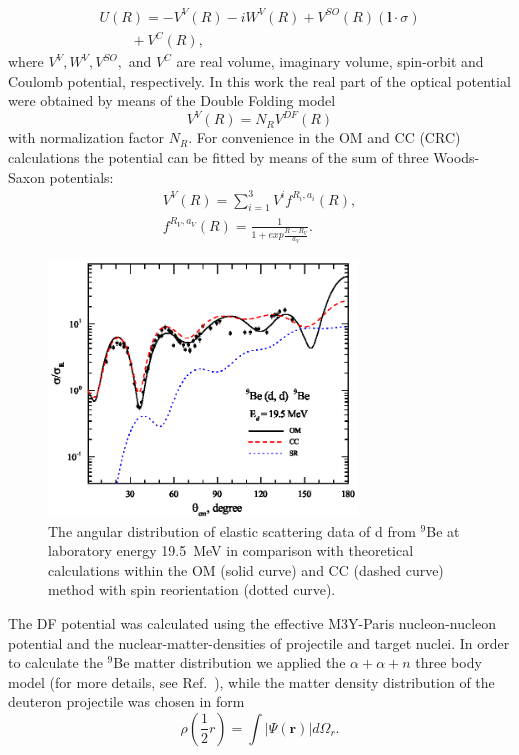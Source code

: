 \documentclass[10pt]{iopart}
\begin{document}
\begin{equation}\label{eqn:OP}
\begin{array}{l}
 U(R)=-V^{V}(R)-iW^{V}(R)+V^{SO}(R)( \mathbf{l} \cdot \sigma )\\
~~~ ~~~~~~~+V^C(R),
\end{array}
\end{equation}
where $V^{V}, W^{V}, V^{SO},$ and $V^C$ are real volume,  imaginary volume, spin-orbit and Coulomb potential, respectively. In this work the real part of the optical potential were obtained by means of the Double Folding model
\begin{equation}
V^V(R) = N_R V^{DF}(R)
\end{equation}
with normalization factor $N_R$. For convenience in the OM and CC (CRC) calculations the potential can be fitted by means of the sum of three Woods-Saxon potentials:
\begin{eqnarray}
V^V(R) =  \sum_{i=1}^{3} V^i f^{R_i, a_i}(R), \\
 f^{R_V,a_V}(R)=\frac{1}{1+exp{\frac{R-R_V}{a_V}}}.
\end{eqnarray}

\begin{figure}[tp]
\centering
\includegraphics[width=8.2cm]{2H9BE_19.eps}
\caption{ \label{2H9BE_19} \footnotesize The angular distribution of elastic scattering data of d from ${}^9$Be at laboratory energy 19.5~MeV in comparison with theoretical calculations within the OM (solid curve) and CC (dashed curve) method with spin reorientation (dotted curve). }
\end{figure}

The DF potential was calculated using the effective M3Y-Paris nucleon-nucleon potential and the nuclear-matter-densities of projectile and target nuclei. In order to calculate the ${}^9$Be matter distribution we applied the $\alpha+\alpha+n$ three body model (for more details, see Ref.~\cite{urazbekov2016}), while the matter density distribution of the deuteron projectile was chosen in form
\begin{equation}
\rho\left( \frac{1}{2}r \right) =\int \vert \Psi (\textbf{r}) \vert d \Omega_r.
\end{equation}
\end{document}
